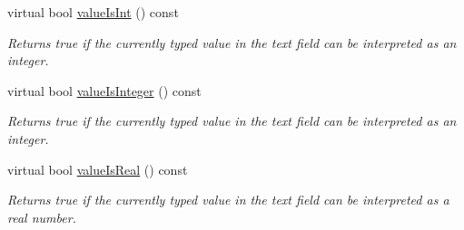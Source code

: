 \begin{DoxyCompactItemize}
virtual bool \mbox{\hyperlink{classGTextField_a4bccf08b3b712af3839106a1cbdc5d02}{value\+Is\+Int}} () const
\begin{DoxyCompactList}\small\item\em Returns true if the currently typed value in the text field can be interpreted as an integer. \end{DoxyCompactList}\item 
virtual bool \mbox{\hyperlink{classGTextField_af5aaf003739648d9aee89a17e715a57e}{value\+Is\+Integer}} () const
\begin{DoxyCompactList}\small\item\em Returns true if the currently typed value in the text field can be interpreted as an integer. \end{DoxyCompactList}\item 
virtual bool \mbox{\hyperlink{classGTextField_a29a5f540431d7993ff00eee5d2584a36}{value\+Is\+Real}} () const
\begin{DoxyCompactList}\small\item\em Returns true if the currently typed value in the text field can be interpreted as a real number. \end{DoxyCompactList}\end{DoxyCompactItemize}
